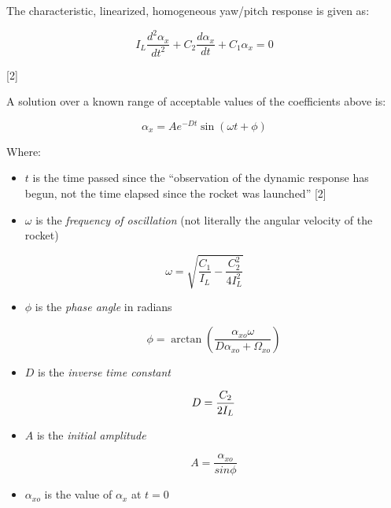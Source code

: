 \documentclass[]{book}
\providecommand{\tightlist}{%
  \setlength{\itemsep}{0pt}\setlength{\parskip}{0pt}}
\begin{document}
The characteristic, linearized, homogeneous yaw/pitch response is given
as:

\begin{equation}
I_L \dfrac{d^2 \alpha_x}{dt^2} + C_2 \dfrac{d \alpha_x}{dt} + C_1 \alpha_x = 0
\end{equation}

{[}2{]}

A solution over a known range of acceptable values of the coefficients
above is:

\begin{equation}
\label{eq_yaw_pitch_time_response}
\alpha_x = A e^{-Dt} \sin(\omega t + \phi)
\end{equation}

Where:

\begin{itemize}
\tightlist
\item
  \(t\) is the time passed since the ``observation of the dynamic
  response has begun, not the time elapsed since the rocket was
  launched'' {[}2{]}
\item
  \(\omega\) is the \emph{frequency of oscillation} (not literally the
  angular velocity of the rocket)
\end{itemize}

\begin{equation}
\label{eq_frequency_oscillation}
\omega = \sqrt{ \dfrac{C_1}{I_L} - \dfrac{C_2^2}{4 I_L^2} }
\end{equation}

\begin{itemize}
\tightlist
\item
  \(\phi\) is the \emph{phase angle} in radians

  \begin{equation}
  \label{eq_phase}
  \phi = 
  \arctan { 
  \left( \dfrac{ \alpha_{xo} \omega } { D\alpha_{xo} + \Omega_{xo} } \right) 
  }
  \end{equation}
\item
  \(D\) is the \emph{inverse time constant}

  \begin{equation}
  \label{eq_inverse_time_constant}
  D = { C_2 \over 2 I_L }
  \end{equation}
\item
  \(A\) is the \emph{initial amplitude}

  \begin{equation}
  A = \dfrac{\alpha_{xo}}{sin \phi}
  \end{equation}
\item
  \(\alpha_{xo}\) is the value of \(\alpha_x\) at \(t=0\)
\end{itemize}
\end{document}
